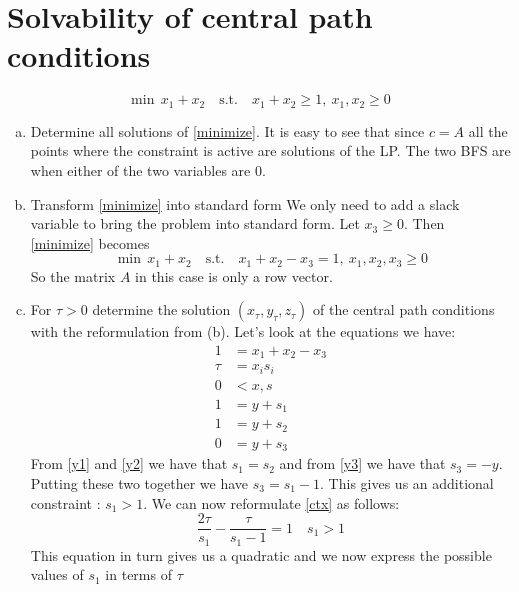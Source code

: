 \documentclass{article}
\begin{document}
	\clearpage
	
	\section{Solvability of central path conditions}
	\vspace{0.5cm}
	\begin{equation}\label{minimize}
		\min \, x_1 + x_2 \quad \text{s.t.} \quad x_1+x_2 \geq 1, \ x_1,x_2\geq 0
	\end{equation}
	\begin{enumerate}[(a)]
		\item Determine all solutions of \ref{minimize}.
		It is easy to see that since $c = A$ all the points where the constraint is active are solutions of the LP. The two BFS are when either of the two variables are 0. 
		\item Transform \ref{minimize} into standard form
		We only need to add a slack variable to bring the problem into standard form. Let $x_3 \geq 0$. Then \ref{minimize} becomes
		\begin{equation}\label{standard}
			\min \, x_1 + x_2 \quad \text{s.t.} \quad x_1+x_2 - x_3 = 1, \  x_1,x_2,x_3 \geq 0
		\end{equation}
		So the matrix $A$ in this case is only a row vector. 
		\item For $\tau >0 $ determine the solution $(x_\tau, y_\tau, z_\tau)$ of the central path conditions with the reformulation from (b). 
		Let's look at the equations we have:
		\begin{align}
			1 &=x_1 + x_2 - x_3 \label{ctx} \\ 
			\tau &= x_i s_i\\
			0 &< x,s\\
			1 &= y + s_1 \label{y1}\\ 
			1 &= y + s_2 \label{y2}\\ 
			0 &= y + s_3 \label{y3}
		\end{align}
	From \ref{y1} and \ref{y2} we have that $s_1 = s_2$ and from \ref{y3} we have that $s_3 = -y$. Putting these two together we have $s_3 = s_1 - 1$. This gives us an additional constraint : $s_1 >1$. We can now reformulate \ref{ctx} as follows:
	\begin{equation}\label{eq:1}
	\frac{2\tau}{s_1} - \frac{\tau}{s_1 - 1} = 1 \quad s_1 >1
	\end{equation}
	This equation in turn gives us a quadratic and we now express the possible values of $s_1$ in terms of $\tau$
	\begin{equation}\label{eq:2}

\end{equation}
\end{enumerate}
\end{document}
